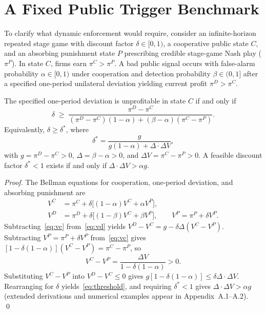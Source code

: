 \section{A Fixed Public Trigger Benchmark}

To clarify what dynamic enforcement would require, consider an infinite-horizon repeated stage game with discount factor $\delta\in[0,1)$, a cooperative public state $C$, and an absorbing punishment state $P$ prescribing credible stage-game Nash play ($\pi^P$). In state $C$, firms earn $\pi^C > \pi^P$. A bad public signal occurs with false-alarm probability $\alpha\in[0,1)$ under cooperation and detection probability $\beta\in(0,1]$ after a specified one-period unilateral deviation yielding current profit $\pi^D > \pi^C$.

\begin{proposition}\label{prop:threshold}
The specified one-period deviation is unprofitable in state $C$ if and only if
\begin{equation}\label{eq:threshold}
\delta \;\geq\;
\frac{\pi^D - \pi^C}
{(\pi^D-\pi^C)(1-\alpha) + (\beta-\alpha)(\pi^C-\pi^P)}.
\end{equation}
Equivalently, $\delta\geq\delta^*$, where
\[
\delta^* = \frac{g}{g(1-\alpha) + \Delta\cdot\Delta V},
\]
with $g=\pi^D-\pi^C>0$, $\Delta=\beta-\alpha>0$, and $\Delta V=\pi^C-\pi^P>0$. A feasible discount factor $\delta^*<1$ exists if and only if $\Delta\cdot\Delta V > \alpha g$.
\end{proposition}

\begin{proof}
The Bellman equations for cooperation, one-period deviation, and absorbing punishment are
\begin{align}
V^C &= \pi^C + \delta\bigl[(1-\alpha)V^C + \alpha V^P\bigr],
\label{eq:vc}\\
V^D &= \pi^D + \delta\bigl[(1-\beta)V^C + \beta V^P\bigr], \qquad
V^P = \pi^P + \delta V^P.
\label{eq:vd}
\end{align}
Subtracting~\eqref{eq:vc} from~\eqref{eq:vd} yields $V^D - V^C = g - \delta\Delta(V^C-V^P)$. Subtracting $V^P=\pi^P+\delta V^P$ from~\eqref{eq:vc} gives $[1-\delta(1-\alpha)](V^C-V^P)=\pi^C-\pi^P$, so
\[
V^C - V^P = \frac{\Delta V}{1-\delta(1-\alpha)} > 0.
\]
Substituting $V^C-V^P$ into $V^D-V^C\leq 0$ gives $g[1-\delta(1-\alpha)] \leq \delta\Delta\cdot\Delta V$. Rearranging for $\delta$ yields~\eqref{eq:threshold}, and requiring $\delta^*<1$ gives $\Delta\cdot\Delta V > \alpha g$ (extended derivations and numerical examples appear in Appendix~A.1--A.2). \qed
\end{proof}

